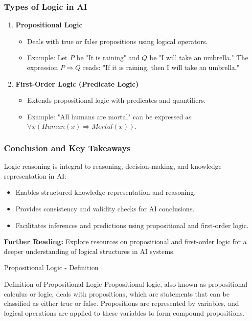 \documentclass[aspectratio=169]{beamer}
\begin{document}
\begin{frame}[fragile]
    \frametitle{Types of Logic in AI}
    \begin{enumerate}
        \item \textbf{Propositional Logic}
        \begin{itemize}
            \item Deals with true or false propositions using logical operators.
            \item Example: Let \( P \) be "It is raining" and \( Q \) be "I will take an umbrella." 
            The expression \( P \Rightarrow Q \) reads: "If it is raining, then I will take an umbrella."
        \end{itemize}

        \item \textbf{First-Order Logic (Predicate Logic)}
        \begin{itemize}
            \item Extends propositional logic with predicates and quantifiers.
            \item Example: "All humans are mortal" can be expressed as \( \forall x (Human(x) \Rightarrow Mortal(x)) \).
        \end{itemize}
    \end{enumerate}
\end{frame}

\begin{frame}[fragile]
    \frametitle{Conclusion and Key Takeaways}
    Logic reasoning is integral to reasoning, decision-making, and knowledge representation in AI:
    \begin{itemize}
        \item Enables structured knowledge representation and reasoning.
        \item Provides consistency and validity checks for AI conclusions.
        \item Facilitates inferences and predictions using propositional and first-order logic.
    \end{itemize}

    \textbf{Further Reading:} Explore resources on propositional and first-order logic for a deeper understanding of logical structures in AI systems.
\end{frame}

\begin{frame}[fragile]{Propositional Logic - Definition}
    \begin{block}{Definition of Propositional Logic}
        Propositional logic, also known as propositional calculus or logic, deals with propositions, which are statements that can be classified as either true or false. Propositions are represented by variables, and logical operations are applied to these variables to form compound propositions.
    \end{block}
\end{frame}
\end{document}

